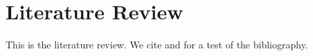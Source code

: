 \documentclass[/../base.tex]{subfiles}
\begin{document}
\section{Literature Review}
This is the literature review. We cite \cite{ahnert2014wake} and \cite{brutti2012transmission} for a test of the bibliography.
\end{document}
